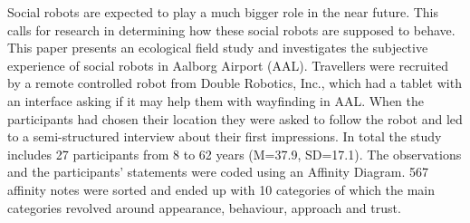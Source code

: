 \label{Abstract}
Social robots are expected to play a much bigger role in the near future. This calls for research in determining how these social robots are supposed to behave. This paper presents an ecological field study and investigates the subjective experience of social robots in Aalborg Airport (AAL). Travellers were recruited by a remote controlled robot from Double Robotics, Inc., which had a tablet with an interface asking if it may help them with wayfinding in AAL. When the participants had chosen their location they were asked to follow the robot and led to a semi-structured interview about their first impressions. In total the study includes 27 participants from 8 to 62 years (M=37.9, SD=17.1). The observations and the participants' statements were coded using an Affinity Diagram. 567 affinity notes were sorted and ended up with 10 categories of which the main categories revolved around appearance, behaviour, approach and trust. 


